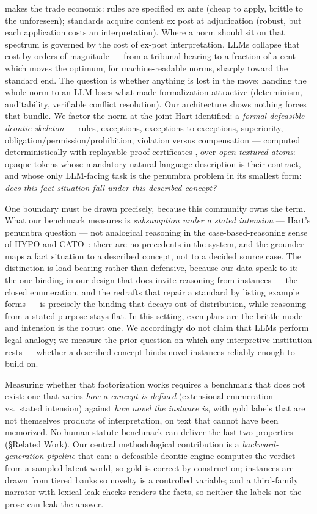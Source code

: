 \citet{kaplow1992rules} makes the trade economic: rules are specified ex ante
(cheap to apply, brittle to the unforeseen); standards acquire content ex post
at adjudication (robust, but each application costs an interpretation). Where
a norm should sit on that spectrum is governed by the cost of ex-post
interpretation. LLMs collapse that cost by orders of magnitude --- from a
tribunal hearing to a fraction of a cent --- which moves the optimum, for
machine-readable norms, sharply toward the standard end. The question is
whether anything is lost in the move: handing the whole norm to an LLM loses
what made formalization attractive (determinism, auditability, verifiable
conflict resolution). Our architecture shows nothing forces that bundle. We
factor the norm at the joint Hart identified: a \emph{formal defeasible
deontic skeleton} --- rules, exceptions, exceptions-to-exceptions,
superiority, obligation/permission/prohibition, violation versus compensation
--- computed deterministically with replayable proof certificates
\citep{governatori2018practical}, over \emph{open-textured atoms}: opaque
tokens whose mandatory natural-language description is their contract, and
whose only LLM-facing task is the penumbra problem in its smallest form:
\emph{does this fact situation fall under this described concept?}

One boundary must be drawn precisely, because this community owns the term.
What our benchmark measures is \emph{subsumption under a stated intension}
--- Hart's penumbra question --- not analogical reasoning in the
case-based-reasoning sense of HYPO and CATO~\citep{ashley1990modeling,
aleven2003using}: there are no precedents in the system, and the grounder
maps a fact situation to a described concept, not to a decided source case.
The distinction is load-bearing rather than defensive, because our data speak
to it: the one binding in our design that does invite reasoning from
instances --- the closed enumeration, and the redrafts that repair a standard
by listing example forms --- is precisely the binding that decays out of
distribution, while reasoning from a stated purpose stays flat. In this
setting, exemplars are the brittle mode and intension is the robust one. We
accordingly do not claim that LLMs perform legal analogy; we measure the
prior question on which any interpretive institution rests --- whether a
described concept binds novel instances reliably enough to build on.

Measuring whether that factorization works requires a benchmark that does not
exist: one that varies \emph{how a concept is defined} (extensional
enumeration vs.\ stated intension) against \emph{how novel the instance is},
with gold labels that are not themselves products of interpretation, on text
that cannot have been memorized. No human-statute benchmark can deliver the
last two properties (\S Related Work). Our central methodological
contribution is a \emph{backward-generation pipeline} that can: a defeasible
deontic engine computes the verdict from a sampled latent world, so gold is
correct by construction; instances are drawn from tiered banks so novelty is
a controlled variable; and a third-family narrator with lexical leak checks
renders the facts, so neither the labels nor the prose can leak the answer.

